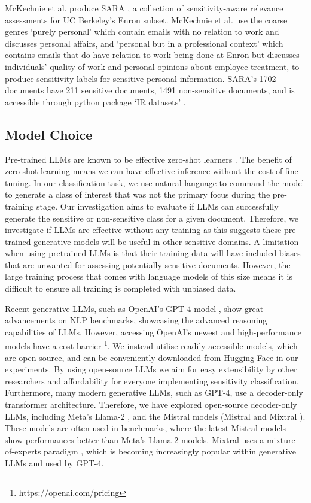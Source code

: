 McKechnie et al. produce SARA \cite{mckechnie2024sara}, a collection of sensitivity-aware relevance assessments for UC Berkeley’s Enron subset. McKechnie et al. use the coarse genres `purely personal' which contain emails with no relation to work and discusses personal affairs, and `personal but in a professional context' which contains emails that do have relation to work being done at Enron but discusses individuals' quality of work and personal opinions about employee treatment, to produce sensitivity labels for sensitive personal information. SARA’s 1702 documents have 211 sensitive documents, 1491 non-sensitive documents, and is accessible through python package `IR datasets' \cite{macavaney2021simplified}.

\subsection{Model Choice}
Pre-trained LLMs are known to be effective zero-shot learners \cite{kojima2022large}. The benefit of zero-shot learning means we can have effective inference without the cost of fine-tuning. In our classification task, we use natural language to command the model to generate a class of interest that was not the primary focus during the pre-training stage. Our investigation aims to evaluate if LLMs can successfully generate the sensitive or non-sensitive class for a given document. Therefore, we investigate if LLMs are effective without any training as this suggests these pre-trained generative models will be useful in other sensitive domains. A limitation when using pretrained LLMs is that their training data will have included biases that are unwanted for assessing potentially sensitive documents. However, the large training process that comes with language models of this size means it is difficult to ensure all training is completed with unbiased data.

Recent generative LLMs, such as OpenAI’s GPT-4 model \cite{openai2023gpt}, show great advancements on NLP benchmarks, showcasing the advanced reasoning capabilities of LLMs. However, accessing OpenAI’s newest and high-performance models have a cost barrier \footnote{https://openai.com/pricing}. We instead utilise readily accessible models, which are open-source, and can be conveniently downloaded from Hugging Face \cite{wolf-etal-2020-transformers} in our experiments. By using open-source LLMs we aim for easy extensibility by other researchers and affordability for everyone implementing sensitivity classification. Furthermore, many modern generative LLMs, such as GPT-4, use a decoder-only transformer architecture. Therefore, we have explored open-source decoder-only LLMs, including Meta’s Llama-2 \cite{touvron2023llama}, and the Mistral models (Mistral \cite{jiang2023mistral} and Mixtral \cite{jiang2024mixtral}). These models are often used in benchmarks, where the latest Mistral models show performances better than Meta’s Llama-2 models. Mixtral uses a mixture-of-experts paradigm \cite{jacobs1991adaptive, shazeer2017outrageously}, which is becoming increasingly popular within generative LLMs and used by GPT-4.

